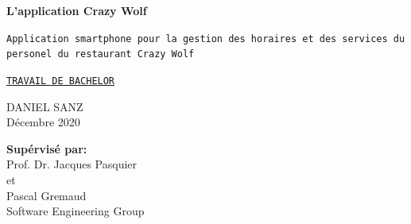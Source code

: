 \begin{titlepage}
    \begin{center}
        \vspace*{1cm}

        \Huge
        \textsf{\textbf{L'application Crazy Wolf}}
 
        \vspace{0.5cm}
        \LARGE
        \texttt{Application smartphone pour la gestion des horaires
        et des services du personel du restaurant Crazy Wolf}
             
        \vspace{1.5cm}
        \large
        \underline{\texttt{TRAVAIL DE BACHELOR}}

        \vspace{2.0cm}
        \Large
        DANIEL SANZ \\
        \large
        Décembre 2020
             
        \vspace{2.0cm}
        \textbf{Supérvisé par:}\\
        Prof. Dr. Jacques Pasquier\\
        et\\
        Pascal Gremaud\\
        Software Engineering Group
        \vfill
        \hrulefill


\end{center}
\end{titlepage}
